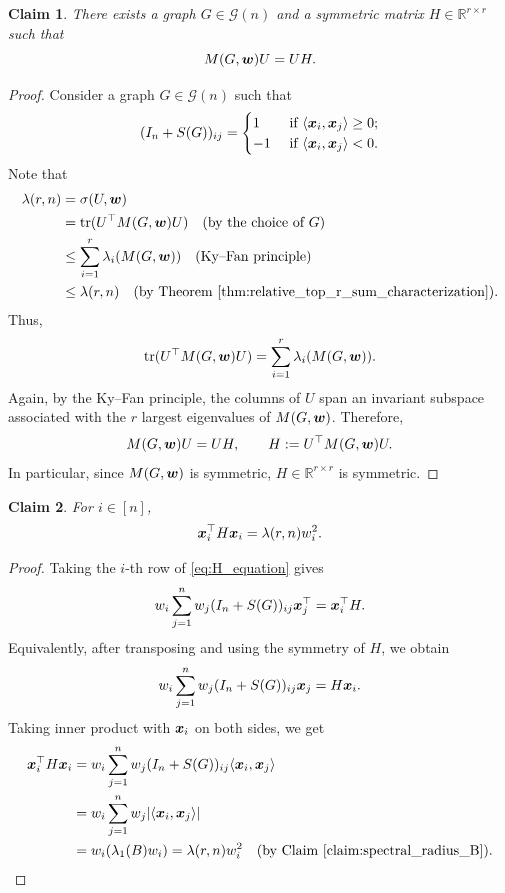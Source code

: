 \documentclass[11pt]{article}
\theoremstyle{plain}
\newtheorem{claim}{Claim}[section]
\numberwithin{equation}{section}
\DeclareMathOperator{\tr}{tr}
\def\w{\mbox{\boldmath $w$}}
\def\x{\mbox{\boldmath $x$}}
\newcommand{\ip}[2]{\langle #1, #2 \rangle}
\begin{document}
\begin{claim} There exists a graph $G\in \mathcal{G}(n)$ and a symmetric matrix $H\in \mathbb{R}^{r\times r}$ such that 
\begin{equation}\label{eq:H_equation}
    M(G, \w) U = UH.
\end{equation}
\end{claim}

\begin{proof} Consider a graph $G\in \mathcal{G}(n)$ such that 
\[ (I_n+S(G))_{ij} = 
\begin{cases}
1 & \text{ if }\ip{\x_i}{\x_j}\ge 0;\\
-1 & \text{ if }\ip{\x_i}{\x_j}< 0.
\end{cases}\]
Note that 
\begin{align*}
   \lambda(r,n) & = \sigma(U, \w)\\
   & = \tr(U^\top M(G, \w)U)\quad (\text{by the choice of }G)\\
   & \le \sum_{i=1}^r \lambda_i(M(G, \w)) \quad (\text{Ky--Fan principle})\\
   & \le \lambda(r,n)\quad (\text{by Theorem \ref{thm:relative_top_r_sum_characterization}}).   
\end{align*}
Thus, 
\[\tr(U^\top M(G, \w)U) = \sum_{i=1}^r \lambda_i(M(G, \w)).\]
Again, by the Ky--Fan principle, the columns of $U$ span an invariant subspace associated with the $r$ largest eigenvalues of $M(G, \w)$. Therefore,
\[
M(G,\w)U=UH,
\qquad
H:=U^\top M(G,\w)U.
\]
In particular, since \(M(G,\w)\) is symmetric, \(H\in\mathbb{R}^{r\times r}\)
is symmetric.
\end{proof}

\begin{claim}\label{claim:H_quadratic_form} For $i\in [n]$, 
    \[\x_i^\top H\x_i =  \lambda(r,n)w_i^2.\]
\end{claim}

\begin{proof}
Taking the $i$-th row of \eqref{eq:H_equation} gives
\[
w_i\sum_{j=1}^n w_j(I_n+S(G))_{ij}\x_j^\top
=
\x_i^\top H.
\]
Equivalently, after transposing and using the symmetry of \(H\), we obtain
\[w_i\sum_{j=1}^n w_j(I_n+S(G))_{ij}\x_j = H\x_i.\]
Taking inner product with $\x_i$ on both sides, we get
\begin{align*}
    \x_i^\top H\x_i & = w_i\sum_{j=1}^n w_j(I_n+S(G))_{ij}\ip{\x_i}{\x_j}\\
    & = w_i\sum_{j=1}^n w_j|\ip{\x_i}{\x_j}|\\
    & = w_i (\lambda_1(B)w_i) = \lambda(r,n)w_i^2 \quad (\text{by Claim \ref{claim:spectral_radius_B}}). \qedhere
\end{align*}
\end{proof}
\end{document}
